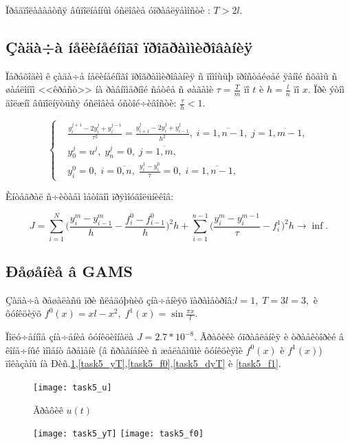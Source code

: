 \documentclass[14pt]{article}
\begin{document}
Ïðåäïîëàãàåòñÿ âûïîëíåííûì óñëîâèå óïðàâëÿåìîñòè : $T > 2 l$.

\subsection{Çàäà÷à íåëèíåéíîãî ïðîãðàììèðîâàíèÿ}

Ïåðåõîäèì ê çàäà÷å íåëèíåéíîãî ïðîãðàììèðîâàíèÿ ñ ïîìîùüþ ïðîñòåéøåé ÿâíîé ñõåìû ñ øàáëîíîì <<êðåñò>> íà ðàâíîìåðíîé ñåòêå ñ øàãàìè $\tau = \frac{T}{m}$ ïî $t$ è $ h = \frac{l}{n}$ ïî $x$. Ïðè ýòîì äîëæíî âûïîëíÿòüñÿ óñëîâèå óñòîé÷èâîñòè: $\frac{\tau}{h} < 1$.

\begin{equation}\label{NLP2}
\left\{ \begin{aligned}
& \frac{y_i^{j+1}-2y_i^j+y_i^{j-1}}{\tau^2} = \frac{y_{i+1}^j-2y_i^j+y_{i-1}^j}{h^2}, \; i = \overline{1,n-1}, \; j = \overline{1,m-1}, \\
& y_0^j = u^j,\; y_n^j = 0,\;  j=\overline{1,m},\;  \\
& y_i^0 = 0 ,\; i = \overline{0,n},\; \frac{y_i^1 - y_i^0}{\tau} = 0,\; i = \overline{1,n-1},
\end{aligned}\right.
\end{equation}

Èíòåãðàë ñ÷èòàåì ìåòîäîì ïðÿìîóãîëüíèêîâ:

$$
    J = \sum_{i=1}^N\Big( \frac{y_i^m-y_{i-1}^m}{h} - \frac{f_i^0-f_{i-1}^0}{h}\Big)^2 h + \sum_{i=1}^{n-1} \Big(\frac{y_i^m-y_i^{m-1}}{\tau} - f_i^1\Big)^2 h \rightarrow \inf.
$$


\subsection{Ðåøåíèå â GAMS}

Çàäà÷à ðåøàëàñü ïðè ñëåäóþùèõ çíà÷åíèÿõ ïàðàìåòðîâ:$l = 1,\; T = 3 l = 3,$ è ôóíêöèÿõ $f^0(x) = xl-x^2,\; f^1(x) = \sin{\frac{\pi x}{l}}$.

Ïîëó÷åííîå çíà÷åíèå ôóíêöèîíàëà $J = 2.7*10^{-8}$. Ãðàôèêè óïðàâëåíèÿ è òðàåêòîðèé â êîíå÷íûé ìîìåíò âðåìåíè (â ñðàâíåíèè ñ æåëàåìûìè ôóíêöèÿìè $f^0(x)$ è $f^1(x)$) ïîêàçàíû íà Ðèñ.\ref{task5_u},\ref{task5_yT},\ref{task5_f0},\ref{task5_dyT} è \ref{task5_f1}.

\begin{figure}
\centering
\texttt{[image: task5\_u]}
\caption{Ãðàôèê $u(t)$}
\label{task5_u}
\end{figure}

\begin{figure}
\begin{floatrow}
    {\texttt{[image: task5\_yT]}}
    {\texttt{[image: task5\_f0]}}
\end{floatrow}
\end{figure}
\end{document}
